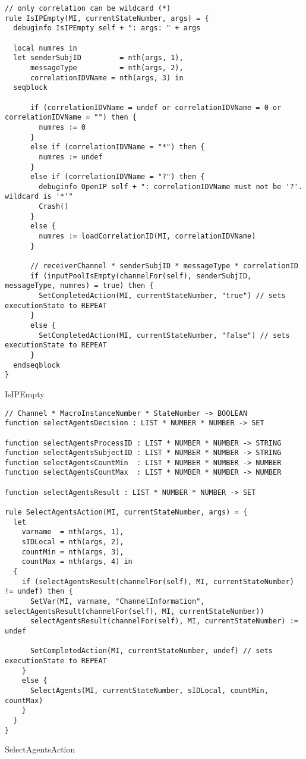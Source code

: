 \begin{listing}[H]
\begin{verbatim}
// only correlation can be wildcard (*)
rule IsIPEmpty(MI, currentStateNumber, args) = {
  debuginfo IsIPEmpty self + ": args: " + args

  local numres in
  let senderSubjID         = nth(args, 1),
      messageType          = nth(args, 2),
      correlationIDVName = nth(args, 3) in
  seqblock

      if (correlationIDVName = undef or correlationIDVName = 0 or correlationIDVName = "") then {
        numres := 0
      }
      else if (correlationIDVName = "*") then {
        numres := undef
      }
      else if (correlationIDVName = "?") then {
        debuginfo OpenIP self + ": correlationIDVName must not be '?'. wildcard is '*'"
        Crash()
      }
      else {
        numres := loadCorrelationID(MI, correlationIDVName)
      }

      // receiverChannel * senderSubjID * messageType * correlationID
      if (inputPoolIsEmpty(channelFor(self), senderSubjID, messageType, numres) = true) then {
        SetCompletedAction(MI, currentStateNumber, "true") // sets executionState to REPEAT
      }
      else {
        SetCompletedAction(MI, currentStateNumber, "false") // sets executionState to REPEAT
      }
  endseqblock
}
\end{verbatim}
\caption{IsIPEmpty}
\label{lst:asm:IsIPEmpty}
\end{listing}




\begin{listing}[H]
\begin{verbatim}
// Channel * MacroInstanceNumber * StateNumber -> BOOLEAN
function selectAgentsDecision : LIST * NUMBER * NUMBER -> SET

function selectAgentsProcessID : LIST * NUMBER * NUMBER -> STRING
function selectAgentsSubjectID : LIST * NUMBER * NUMBER -> STRING
function selectAgentsCountMin  : LIST * NUMBER * NUMBER -> NUMBER
function selectAgentsCountMax  : LIST * NUMBER * NUMBER -> NUMBER

function selectAgentsResult : LIST * NUMBER * NUMBER -> SET

rule SelectAgentsAction(MI, currentStateNumber, args) = {
  let
    varname  = nth(args, 1),
    sIDLocal = nth(args, 2),
    countMin = nth(args, 3),
    countMax = nth(args, 4) in
  {
    if (selectAgentsResult(channelFor(self), MI, currentStateNumber) != undef) then {
      SetVar(MI, varname, "ChannelInformation", selectAgentsResult(channelFor(self), MI, currentStateNumber))
      selectAgentsResult(channelFor(self), MI, currentStateNumber) := undef

      SetCompletedAction(MI, currentStateNumber, undef) // sets executionState to REPEAT
    }
    else {
      SelectAgents(MI, currentStateNumber, sIDLocal, countMin, countMax)
    }
  }
}
\end{verbatim}
\caption{SelectAgentsAction}
\label{lst:asm:SelectAgentsAction}
\end{listing}




